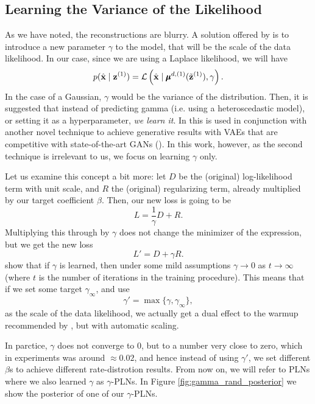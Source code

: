 \subsection{Learning the Variance of the Likelihood}
\label{sec:learn_gamma}
\par
As we have noted, the reconstructions are blurry.
A solution offered by \cite{dai2019diagnosing} is to introduce a new parameter
$\gamma$ to the model, that will be the scale of the data likelihood. In our
case, since we are using a Laplace likelihood, we will have
\[
  p(\hat{\mathbf{x}} \mid \mathbf{z}^{(1)}) = \mathcal{L}\left( \hat{\mathbf{x}} \mid \pmb{\mu}^{d,
      (1)}(\tilde{\mathbf{z}}^{(1)}), \gamma \right).
\]
In the case of a Gaussian, $\gamma$ would be the variance of the distribution.
Then, it is suggested that instead of predicting gamma (i.e. using a
heteroscedastic model), or setting it as a hyperparameter, \textit{we learn it}.
In \cite{dai2019diagnosing} this is used in conjunction with another novel
technique to achieve generative results with VAEs that are competitive with
state-of-the-art GANs (\cite{goodfellow2014generative}). In this work, however,
as the second technique is irrelevant to us, we focus on learning $\gamma$ only.
\par
Let us examine this concept a bit more: let $D$ be the (original) log-likelihood
term with unit scale, and $R$ the (original) regularizing term, already
multiplied by our target coefficient $\beta$. Then, our new loss is going to be
\[
  L = \frac{1}{\gamma}D + R.
\]
Multiplying this through by $\gamma$ does not change the minimizer of the
expression, but we get the new loss
\[
  L' = D + \gamma R.
\]
\cite{dai2019diagnosing} show that if $\gamma$ is learned, then under some mild
assumptions $\gamma \rightarrow 0$ as $t \rightarrow \infty$ (where $t$ is the
number of iterations in the training procedure). This means that if we set some
target $\gamma_\infty$, and use
\[
  \gamma' = \max\{ \gamma, \gamma_\infty \},
\]
as the scale of the data likelihood, we actually get a dual effect to the warmup
recommended by \cite{sonderby2016train}, but with automatic scaling.
\par
In parctice, $\gamma$ does not converge to 0, but to a number very close to
zero, which in experiments was around $\approx 0.02$, and hence instead of using
$\gamma'$, we set different $\beta$s to achieve different rate-distrotion
results. From now on, we will refer to PLNs where we also learned $\gamma$ as
$\gamma$-PLNs. In Figure \ref{fig:gamma_rand_posterior} we show the posterior of 
one of our $\gamma$-PLNs.
